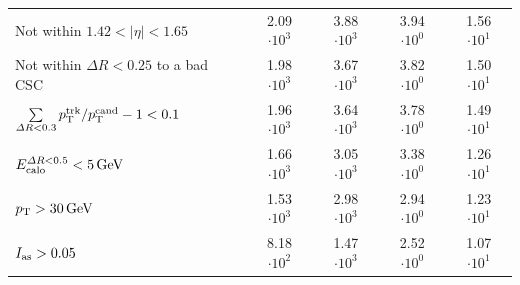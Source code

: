 \begin{table}[!h]
{\begin{tabular}{|l|c|c|c|c|}
Not within $1.42<|\eta|<1.65$                                                             & 2.09 $\cdot10^{3 }$ & 3.88 $\cdot10^{3 }$ & 3.94 $\cdot10^{0 }$ & 1.56 $\cdot10^{1 }$ \\
Not within $\Delta R<0.25$ to a bad CSC                                                   & 1.98 $\cdot10^{3 }$ & 3.67 $\cdot10^{3 }$ & 3.82 $\cdot10^{0 }$ & 1.50 $\cdot10^{1 }$ \\
$\sum \limits_{\Delta R < 0.3} p_{\text{T}}^{\text{trk}}/p_{\text{T}}^{\text{cand}} - 1 < 0.1$              & 1.96 $\cdot10^{3 }$ & 3.64 $\cdot10^{3 }$ & 3.78 $\cdot10^{0 }$ & 1.49 $\cdot10^{1 }$ \\
$E^{\Delta R<0.5}_{\text{calo}}<5\,\text{Ge}\kern-0.06667em\text{V}$                                                                            & 1.66 $\cdot10^{3 }$ & 3.05 $\cdot10^{3 }$ & 3.38 $\cdot10^{0 }$ & 1.26 $\cdot10^{1 }$ \\
\midrule
$p_{\text{T}}>30\,\text{Ge}\kern-0.06667em\text{V}$                                                                              & 1.53 $\cdot10^{3 }$ & 2.98 $\cdot10^{3 }$ & 2.94 $\cdot10^{0 }$ & 1.23 $\cdot10^{1 }$ \\
$I_{\text{as}}>0.05$                                                                               & 8.18 $\cdot10^{2 }$ & 1.47 $\cdot10^{3 }$ & 2.52 $\cdot10^{0 }$ & 1.07 $\cdot10^{1 }$ \\
\bottomrule
\end{tabular}}
\end{table}  

